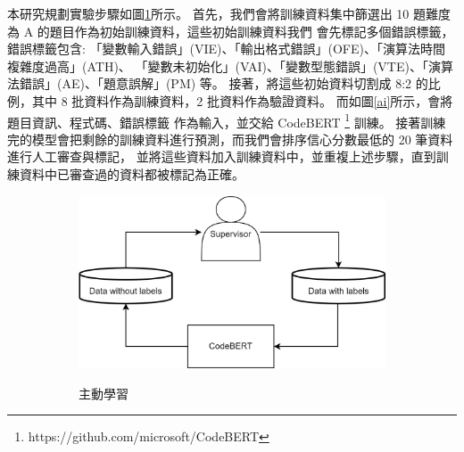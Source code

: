 \documentclass[12pt]{article}
\begin{document}
\begin{enumerate}
\begin{enumerate}
\begin{enumerate}[label=(\arabic*)]
              \par 本研究規劃實驗步驟如圖\ref{ai2}所示。
              首先，我們會將訓練資料集中篩選出 10 題難度為 A 的題目作為初始訓練資料，這些初始訓練資料我們
              會先標記多個錯誤標籤，錯誤標籤包含: 「變數輸入錯誤」(VIE)、「輸出格式錯誤」(OFE)、「演算法時間複雜度過高」(ATH)、
              「變數未初始化」(VAI)、「變數型態錯誤」(VTE)、「演算法錯誤」(AE)、「題意誤解」(PM) 等。
              接著，將這些初始資料切割成 8:2 的比例，其中 8 批資料作為訓練資料，2 批資料作為驗證資料。
              而如圖\ref{ai}所示，會將 題目資訊、程式碼、錯誤標籤 作為輸入，並交給 CodeBERT \footnote{https://github.com/microsoft/CodeBERT} 訓練。
              接著訓練完的模型會把剩餘的訓練資料進行預測，而我們會排序信心分數最低的 20 筆資料進行人工審查與標記，
              並將這些資料加入訓練資料中，並重複上述步驟，直到訓練資料中已審查過的資料都被標記為正確。
              \begin{figure}[H]
                \centering
                \begin{subfigure}{0.3\linewidth}
                  \centering
                  \href{https://raw.githubusercontent.com/programingtw/proglearn-plan/main/img/ai2.jpg}{
                    \includegraphics[width=\textwidth]{./img/ai2.jpg}
                  }
                  \caption{主動學習}
                  \label{ai2}
                \end{subfigure}
                \begin{subfigure}{0.3\linewidth}
                  \centering
                  \href{https://raw.githubusercontent.com/programingtw/proglearn-plan/main/img/ai.jpg}{
}
\end{subfigure}
\end{figure}
\end{enumerate}
\end{enumerate}
\end{enumerate}
\end{document}
